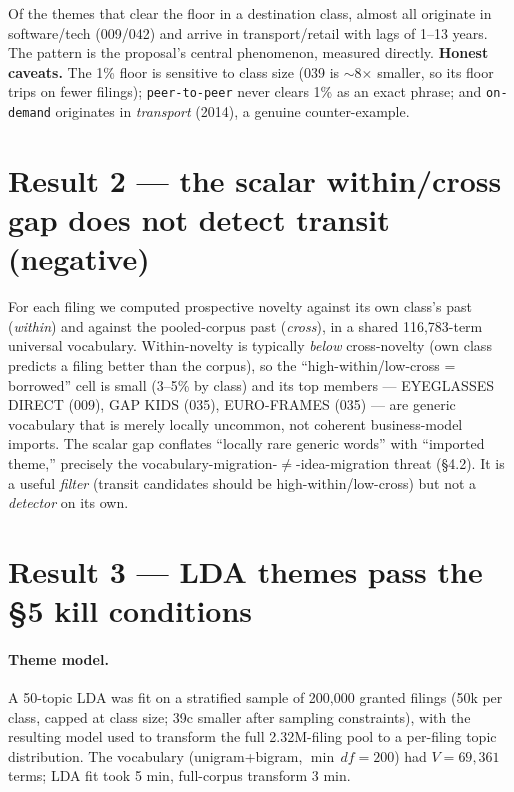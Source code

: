 \documentclass[11pt]{article}
\begin{document}
\noindent Of the themes that clear the floor in a destination class, almost all
originate in software/tech (009/042) and arrive in transport/retail with lags of
1--13 years. The pattern is the proposal's central phenomenon, measured directly.
\textbf{Honest caveats.} The 1\% floor is sensitive to class size (039 is
$\sim$8$\times$ smaller, so its floor trips on fewer filings);
\texttt{peer-to-peer} never clears 1\% as an exact phrase; and \texttt{on-demand}
originates in \emph{transport} (2014), a genuine counter-example.

\section{Result 2 --- the scalar within/cross gap does not detect transit (negative)}
For each filing we computed prospective novelty against its own class's past
(\textit{within}) and against the pooled-corpus past (\textit{cross}), in a shared
116{,}783-term universal vocabulary. Within-novelty is typically \emph{below}
cross-novelty (own class predicts a filing better than the corpus), so the
``high-within/low-cross = borrowed'' cell is small (3--5\% by class) and its top
members --- EYEGLASSES DIRECT (009), GAP KIDS (035), EURO-FRAMES (035) --- are
generic vocabulary that is merely locally uncommon, not coherent business-model
imports. The scalar gap conflates ``locally rare generic words'' with ``imported
theme,'' precisely the vocabulary-migration-$\neq$-idea-migration threat (§4.2).
It is a useful \emph{filter} (transit candidates should be high-within/low-cross)
but not a \emph{detector} on its own.

\section{Result 3 --- LDA themes pass the §5 kill conditions}

\paragraph{Theme model.} A 50-topic LDA was fit on a stratified sample of 200{,}000
granted filings (50k per class, capped at class size; 39c smaller after sampling
constraints), with the resulting model used to transform the full 2.32M-filing
pool to a per-filing topic distribution. The vocabulary (unigram+bigram,
$\min\,df=200$) had $V=69{,}361$ terms; LDA fit took 5 min, full-corpus
transform 3 min.
\end{document}
